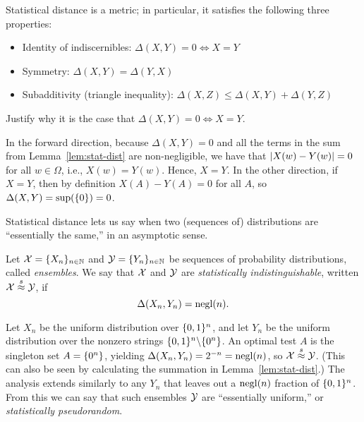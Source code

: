 \documentclass[11pt]{article}
\begin{document}
\begin{lemma}
  Statistical distance is a metric; in particular, it satisfies the
  following three properties:
  \begin{itemize}
  \item Identity of indiscernibles: $\Delta(X,Y) = 0 \iff X = Y$
  \item Symmetry: $\Delta(X,Y) = \Delta(Y,X)$
  \item Subadditivity (triangle inequality):
    $\Delta(X,Z) \leq \Delta(X,Y) + \Delta(Y, Z)$
  \end{itemize}
\end{lemma}

\begin{question}
  Justify why it is the case that $\Delta(X,Y) = 0 \iff X = Y$.
\end{question}

\begin{answer}
  In the forward direction, because $\Delta(X,Y) = 0$ and all the
  terms in the sum from Lemma~\ref{lem:stat-dist} are non-negligible,
  we have that $\lvert X(w) - Y(w)\rvert = 0$ for all $w \in \Omega$, i.e.,
  $X(w) = Y(w)$. Hence, $X = Y$. In the other direction, if $X = Y$,
  then by definition $X(A) - Y(A) = 0$ for all $A$, so
  $\Delta(X,Y) = \sup(\{0\}) = 0$.
\end{answer}

Statistical distance lets us say when two (sequences of) distributions
are ``essentially the same,'' in an asymptotic sense.

\begin{definition}
  \label{def:stat-ind}
  Let $\mathcal{X} = \{X_{n}\}_{n \in \mathbb{N}}$ and
  $\mathcal{Y} = \{Y_{n}\}_{n \in \mathbb{N}}$ be sequences of probability
  distributions, called \emph{ensembles}.  We say that $\mathcal{X}$ and
  $\mathcal{Y}$ are \emph{statistically indistinguishable}, written
  $\mathcal{X} \stackrel{s}{\approx} \mathcal{Y}$, if \[ \Delta(X_{n}, Y_{n}) = \operatorname{negl}(n). \]
\end{definition}

\begin{example}
  Let $X_{n}$ be the uniform distribution over $\{0,1\}^{n}$, and let
  $Y_{n}$ be the uniform distribution over the nonzero strings
  $\{0,1\}^{n} \backslash \{0^{n}\}$.  An optimal test $A$ is the
  singleton set $A = \{0^{n}\}$, yielding
  $\Delta(X_{n}, Y_{n}) = 2^{-n} = \operatorname{negl}(n)$, so
  $\mathcal{X} \stackrel{s}{\approx} \mathcal{Y}$.  (This can also be seen by calculating the
  summation in Lemma~\ref{lem:stat-dist}.)  The analysis extends
  similarly to any $Y_{n}$ that leaves out a $\operatorname{negl}(n)$ fraction of
  $\{0,1\}^{n}$.  From this we can say that such ensembles $\mathcal{Y}$ are
  ``essentially uniform,'' or \emph{statistically pseudorandom}.
\end{example}
\end{document}
